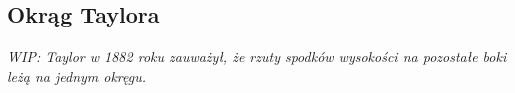 \subsection{Okrąg Taylora}
{
    \emph{WIP: Taylor w 1882 roku zauważył, że rzuty spodków wysokości na pozostałe boki leżą na jednym okręgu.}
}